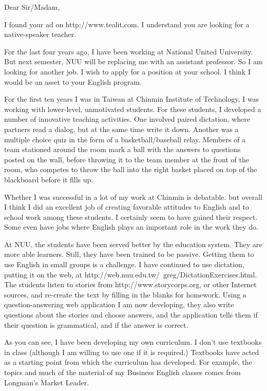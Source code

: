 \documentclass{letter}
\begin{document}
{}
\begin{letter}
\opening{Dear Sir/Madam,}

I found your ad on http://www.tealit.com. I understand you are looking for a native-speaker teacher.

For the last four years ago, I have been working at National United University. But next semester, NUU will be replacing me with an assistant professor. So I am looking for another job. I wish to apply for a position at your school. I think I would be an asset to your English program.

For the first ten years I was in Taiwan at Chinmin Institute of Technology, I was working with lower-level, unmotivated students. For these students, I developed a number of innovative teaching activities. One involved paired dictation, where partners read a dialog, but at the same time write it down. Another was a multiple choice quiz in the form of a basketball/baseball relay. Members of a team stationed around the room mark a ball with the answers to questions posted on the wall, before throwing it to the team member at the front of the room, who competes to throw the ball into the right basket placed on top of the blackboard before it fills up.

Whether I was successful in a lot of my work at Chinmin is debatable. but overall I think I did an excellent job of creating favorable attitudes to English and to school work among these students. I certainly seem to have gained their respect. Some even have jobs where English plays an important role in the work they do.

At NUU, the students have been served better by the education system. They are more able learners. Still, they have been trained to be passive. Getting them to use English in small groups is a challenge. I have continued to use dictation, putting it on the web, at http://web.nuu.edu.tw/~greg/DictationExercises.html. The students listen to stories from http://www.storycorps.org, or other Internet sources, and re-create the text by filling in the blanks for homework. Using a question-answering web application I am now developing, they also write questions about the stories and choose answers, and the application tells them if their question is grammatical, and if the answer is correct.

As you can see, I have been developing my own curriculum. I don't use textbooks in class (although I am willing to use one if it is required.) Textbooks have acted as a starting point from which the curriculum has developed. For example, the topics and much of the material of my Business English classes comes from Longman's Market Leader.
 

\end{letter}
\end{document}
